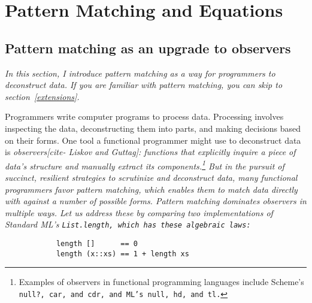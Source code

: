 \documentclass[manuscript,screen,review, 12pt]{acmart}
\begin{document}


\section{Pattern Matching and Equations}
\label{pmandequations}
\subsection{Pattern matching as an upgrade to observers}
\label{pmoverobservers}

    \it{In this section, I introduce pattern matching as a way for programmers
    to deconstruct data. If you are familiar with pattern matching, you can skip
    to section~\ref{extensions}.}
    
    Programmers write computer programs to process data. Processing involves
    inspecting the data, deconstructing them into parts, and making decisions
    based on their forms. One tool a functional programmer might use to
    deconstruct data is \it{observers}[cite- Liskov and Guttag]: functions that
    explicitly inquire a piece of data's structure and manually extract its
    components.\footnote {Examples of observers in functional programming
    languages include Scheme's \tt{null?}, \tt{car}, and \tt{cdr}, and ML's
    \tt{null}, \tt{hd}, and \tt{tl}.} But in the pursuit of succinct, resilient
    strategies to scrutinize and deconstruct data, many functional programmers
    favor \it{pattern matching}, which enables them to match data directly with
    against a number of possible forms. Pattern matching dominates observers in
    multiple ways. Let us address these by comparing two implementations of
    Standard ML's \tt{List.length}, which has these algebraic laws: 

    \begin{minipage}[t]{\textwidth}
        \begin{verbatim}
            length []      == 0
            length (x::xs) == 1 + length xs 
        \end{verbatim}
    \end{minipage}
    
\end{document}
